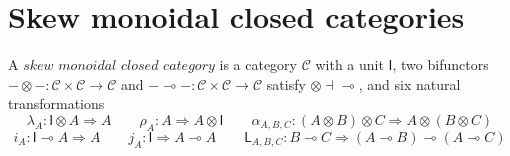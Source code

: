 \documentclass[submission,copyright,creativecommons]{eptcs}
\newcommand{\ot}{\otimes}
\newcommand{\lolli}{\multimap}
\newcommand{\I}{\mathsf{I}}
\newcommand{\msfL}{\mathsf{L}}
\begin{document}
\section{Skew monoidal closed categories}
A $skew$ $monoidal$ $closed$ $category$\cite{street:skew-closed:2013} is a category $\mathcal{C}$ with a unit $\mathsf{I}$, two bifunctors $- \ot - : \mathcal{C} \times \mathcal{C} \longrightarrow \mathcal{C}$ and $- \lolli - : \mathcal{C} \times \mathcal{C} \longrightarrow \mathcal{C}$
satisfy $\ot \dashv \lolli$, and six natural transformations
\begin{displaymath}
  \lambda_A : \mathsf{I} \otimes A \Longrightarrow A \qquad
  \rho_A : A \Longrightarrow A \otimes \mathsf{I} \qquad
  \alpha_{A,B,C} : (A\otimes B) \otimes C \Longrightarrow A\otimes (B\otimes C)
\end{displaymath}
\begin{displaymath}
  i_A : \I \lolli A \Longrightarrow A \qquad
  j_A : \I \Longrightarrow A \lolli A \qquad
  \msfL_{A, B, C} : B \lolli C \Longrightarrow (A \lolli B) \lolli (A \lolli C)
\end{displaymath}
\end{document}

